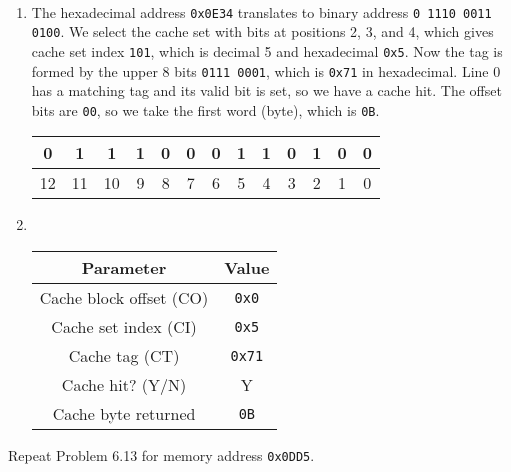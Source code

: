 \documentclass[12pt]{article}
\newenvironment{ex}[2][Exercise]{\begin{trivlist}
		\item[\hskip \labelsep {\bfseries #1}\hskip \labelsep {\bfseries #2.}]}{\end{trivlist}}
\newenvironment{sol}[1][Solution]{\begin{trivlist}
		\item[\hskip \labelsep {\bfseries #1:}]}{\end{trivlist}}
\begin{document}
\begin{sol}
	\
	\begin{enumerate}[label=(\alph*)]
		\item The hexadecimal address \texttt{0x0E34} translates to binary address
		\texttt{0 1110 0011 0100}. We select the cache set with bits at positions 2, 3, and
		4, which gives cache set index \texttt{101}, which is decimal 5 and hexadecimal \texttt{0x5}.
		Now the tag is formed by the upper 8 bits \texttt{0111 0001}, which is \texttt{0x71} in
		hexadecimal. Line 0 has a matching tag and its valid bit is set, so we have a cache hit.
		The offset bits are \texttt{00}, so we take the first word (byte), which is
		\texttt{0B}.
		\begin{center}
			\begin{tabular}{|c|c|c|c|c|c|c|c|c|c|c|c|c|}
				\hline
				0 & 1 & 1 & 1 & 0 & 0 & 0 & 1 & 1 & 0 & 1 & 0 & 0\\
				\hline
				12 & 11 & 10 & 9 & 8 & 7 & 6 & 5 & 4 & 3 & 2 & 1 & 0
			\end{tabular}
		\end{center}
		\item \
		\begin{center}
			\begin{tabular}{cc}
				Parameter & Value\\
				\hline
				Cache block offset (CO) & \texttt{0x0}\\
				Cache set index (CI) & \texttt{0x5}\\
				Cache tag (CT) & \texttt{0x71}\\
				Cache hit? (Y/N) & Y\\
				Cache byte returned & \texttt{0B}
			\end{tabular}
		\end{center}
	\end{enumerate}
\end{sol}

\begin{ex}{6.14}
	Repeat Problem 6.13 for memory address \texttt{0x0DD5}.
\end{ex}
\end{document}
